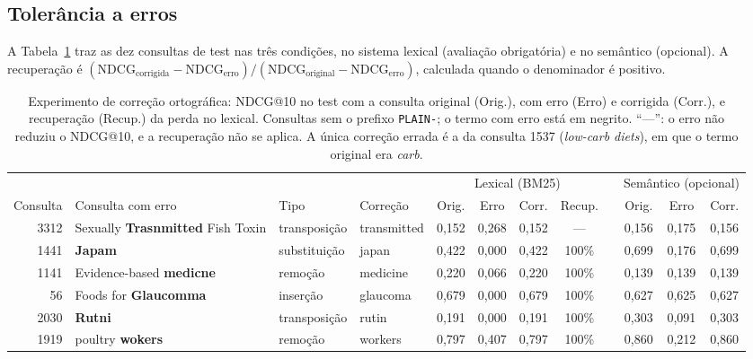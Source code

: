\documentclass[10pt,a4paper]{article}
\begin{document}
\subsection{Tolerância a erros}
\label{sec:res-erros}

A Tabela~\ref{tab:typo} traz as dez consultas de test nas três condições, no sistema lexical (avaliação obrigatória) e no semântico (opcional). A recuperação é $(\mathrm{NDCG}_{\text{corrigida}} - \mathrm{NDCG}_{\text{erro}}) / (\mathrm{NDCG}_{\text{original}} - \mathrm{NDCG}_{\text{erro}})$, calculada quando o denominador é positivo.

\begin{table}[!htb]
\centering\footnotesize
\setlength{\tabcolsep}{3.5pt}
\caption{Experimento de correção ortográfica: NDCG@10 no test com a consulta original (Orig.), com erro (Erro) e corrigida (Corr.), e recuperação (Recup.) da perda no lexical. Consultas sem o prefixo \texttt{PLAIN-}; o termo com erro está em negrito. ``---'': o erro não reduziu o NDCG@10, e a recuperação não se aplica. A única correção errada é a da consulta 1537 (\emph{low-carb diets}), em que o termo original era \emph{carb}.}
\label{tab:typo}
\begin{tabular}{@{}rlllcccccccc@{}}
\toprule
 & & & & \multicolumn{4}{c}{Lexical (BM25)} & & \multicolumn{3}{c}{Semântico (opcional)} \\
\cmidrule(lr){5-8}\cmidrule(l){10-12}
Consulta & Consulta com erro & Tipo & Correção & Orig. & Erro & Corr. & Recup. & & Orig. & Erro & Corr. \\
\midrule
3312 & Sexually \textbf{Trasnmitted} Fish Toxin & transposição & transmitted & 0,152 & 0,268 & 0,152 & --- & & 0,156 & 0,175 & 0,156 \\
1441 & \textbf{Japam} & substituição & japan & 0,422 & 0,000 & 0,422 & 100\% & & 0,699 & 0,176 & 0,699 \\
1141 & Evidence-based \textbf{medicne} & remoção & medicine & 0,220 & 0,066 & 0,220 & 100\% & & 0,139 & 0,139 & 0,139 \\
56 & Foods for \textbf{Glaucomma} & inserção & glaucoma & 0,679 & 0,000 & 0,679 & 100\% & & 0,627 & 0,625 & 0,627 \\
2030 & \textbf{Rutni} & transposição & rutin & 0,191 & 0,000 & 0,191 & 100\% & & 0,303 & 0,091 & 0,303 \\
1919 & poultry \textbf{wokers} & remoção & workers & 0,797 & 0,407 & 0,797 & 100\% & & 0,860 & 0,212 & 0,860 \\

\end{tabular}
\end{table}
\end{document}
